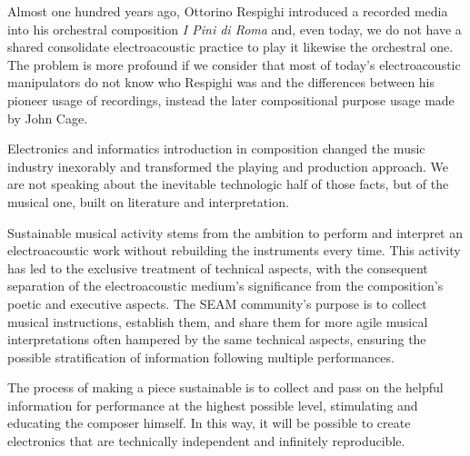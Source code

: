 Almost one hundred years ago, Ottorino Respighi introduced a recorded media into
his orchestral composition \emph{I Pini di Roma} \cite{ropr25} and, even today,
we do not have a shared consolidate electroacoustic practice to play it likewise
the orchestral one. The problem is more profound if we consider that most of
today's electroacoustic manipulators do not know who Respighi was and the
differences between his pioneer usage of recordings, instead the later
compositional purpose usage made by John Cage. \cite{cjil39}

Electronics and informatics introduction in composition changed the music industry inexorably and transformed the playing and production approach. We are not
speaking about the inevitable technologic half of those facts, but of the
musical one, built on literature and interpretation.

Sustainable musical activity stems from the ambition to perform and interpret an electroacoustic work without rebuilding the instruments every time. This
activity has led to the exclusive treatment of technical aspects, with the
consequent separation of the electroacoustic medium's significance from the
composition's poetic and executive aspects. The SEAM community's purpose is to
collect musical instructions, establish them, and share them for more agile
musical interpretations often hampered by the same technical aspects, ensuring
the possible stratification of information following multiple performances.

The process of making a piece sustainable is to collect and pass on the helpful information for performance at the highest possible level, stimulating and
educating the composer himself. In this way, it will be possible to create
electronics that are technically independent and infinitely reproducible.

\vfill\null

\raggedright



%
% 




